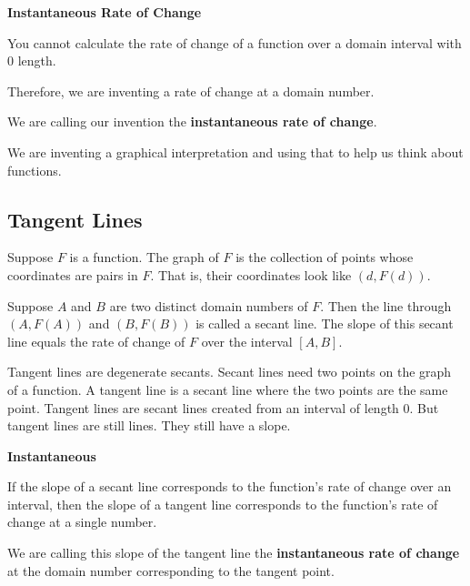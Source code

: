 \documentclass{ximera}
\begin{document}
\begin{idea} \textbf{\textcolor{blue!55!black}{Instantaneous Rate of Change}} 

You cannot calculate the rate of change of a function over a domain interval with $0$ length.  

Therefore, we are inventing a rate of change at a domain number. 

We are calling our invention the \textbf{\textcolor{blue!55!black}{instantaneous rate of change}}.

We are inventing a graphical interpretation and using that to help us think about functions.

\end{idea}











\subsection*{Tangent Lines}

Suppose $F$ is a function.  The graph of $F$ is the collection of points whose coordinates are pairs in $F$.  That is, their coordinates look like $(d, F(d))$.

Suppose $A$ and $B$ are two distinct domain numbers of $F$.  Then the line through $(A, F(A))$ and $(B, F(B))$ is called a secant line.  The slope of this secant line equals the rate of change of $F$ over the interval $[A, B]$.

Tangent lines are degenerate secants. Secant lines need two points on the graph of a function.  A tangent line is a secant line where the two points are the same point. Tangent lines are secant lines created from an interval of length $0$.  But tangent lines are still lines.  They still have a slope.


\begin{conclusion} \textbf{\textcolor{green!25!black}{Instantaneous}}

If the slope of a secant line corresponds to the function's rate of change over an interval, then the slope of a tangent line corresponds to the function's rate of change at a single number.

\end{conclusion}


We are calling this slope of the tangent line the \textbf{\textcolor{purple!85!blue}{instantaneous rate of change}} at the domain number corresponding to the tangent point.
\end{document}
